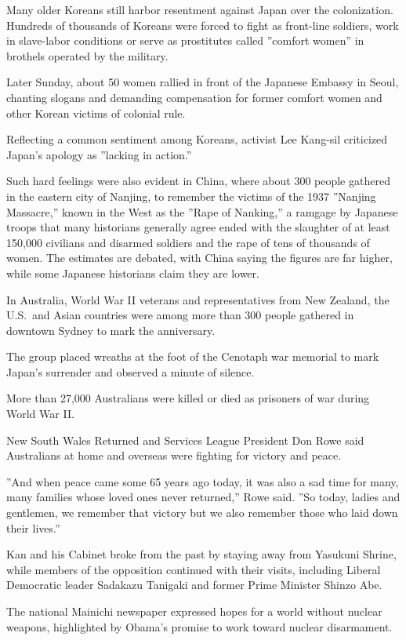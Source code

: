 ﻿\documentclass[12pt]{article}
\begin{document}
Many older Koreans still harbor resentment against Japan over the colonization. Hundreds of
thousands of Koreans were forced to fight as front-line soldiers, work in slave-labor conditions or
serve as prostitutes called ''comfort women'' in brothels operated by the military.

Later Sunday, about 50 women rallied in front of the Japanese Embassy in Seoul, chanting slogans and
demanding compensation for former comfort women and other Korean victims of colonial rule.

Reflecting a common sentiment among Koreans, activist Lee Kang-sil criticized Japan's apology as
''lacking in action.''

Such hard feelings were also evident in China, where about 300 people gathered in the eastern city
of Nanjing, to remember the victims of the 1937 ''Nanjing Massacre,'' known in the West as the
''Rape of Nanking,'' a ramgage by Japanese troops that many historians generally agree ended with
the slaughter of at least 150,000 civilians and disarmed soldiers and the rape of tens of thousands
of women. The estimates are debated, with China saying the figures are far higher, while some
Japanese historians claim they are lower.

In Australia, World War II veterans and representatives from New Zealand, the U.S.~and Asian
countries were among more than 300 people gathered in downtown Sydney to mark the anniversary.

The group placed wreaths at the foot of the Cenotaph war memorial to mark Japan's surrender and
observed a minute of silence.

More than 27,000 Australians were killed or died as prisoners of war during World War II.

New South Wales Returned and Services League President Don Rowe said Australians at home and
overseas were fighting for victory and peace.

''And when peace came some 65 years ago today, it was also a sad time for many, many families whose
loved ones never returned,'' Rowe said. ''So today, ladies and gentlemen, we remember that victory
but we also remember those who laid down their lives.''

Kan and his Cabinet broke from the past by staying away from Yasukuni Shrine, while members of the
opposition continued with their visits, including Liberal Democratic leader Sadakazu Tanigaki and
former Prime Minister Shinzo Abe.

The national Mainichi newspaper expressed hopes for a world without nuclear weapons, highlighted by
Obama's promise to work toward nuclear disarmament.
\end{document}
